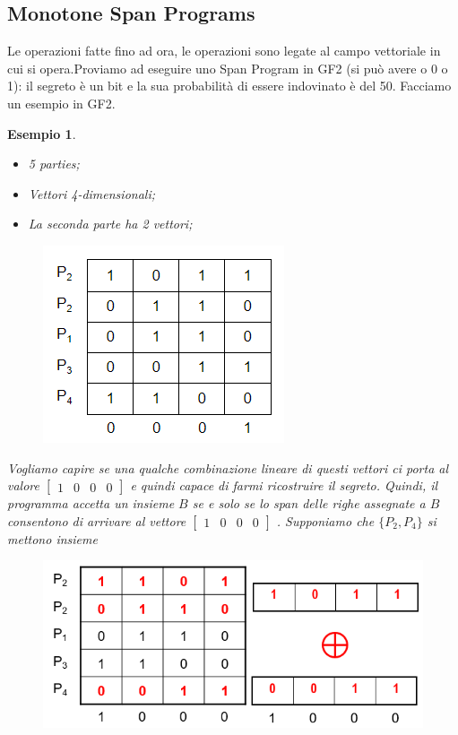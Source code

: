 \documentclass{book}
\newtheorem{esempio}{\textcolor{Grey1}{Esempio}}
\begin{document}
\subsection{Monotone Span Programs}
Le operazioni fatte fino ad ora, le operazioni sono legate al campo vettoriale in cui si opera\@.Proviamo ad eseguire uno Span Program in GF2 (si può avere o 0 o 1): il segreto è un bit e la sua probabilità di essere indovinato è del 50. Facciamo un esempio in GF2.
\begin{esempio}
\begin{itemize}
    \item 5 parties;
    \item Vettori 4-dimensionali;
    \item La seconda parte ha 2 vettori;
\end{itemize}
\begin{figure}[h]
    \centering
    \includegraphics[scale=0.5]{2022-01-08-15-15-29.png}%
\end{figure}
Vogliamo capire se una qualche combinazione lineare di questi vettori ci porta al valore \(\begin{bmatrix}
    1&0&0&0
\end{bmatrix}\) e quindi capace di farmi ricostruire il segreto\@. Quindi, il programma accetta un insieme \(B\) se e solo se lo span delle righe assegnate a \(B\) consentono di arrivare al vettore \(\begin{bmatrix}
    1&0&0&0
\end{bmatrix}\) \@.
Supponiamo che \( \{P_{2},P_{4}\} \) si mettono insieme
\setlength\intextsep{0pt}
\begin{figure}[h]
	\centering
	\includegraphics[scale=0.4]{2022-01-08-15-24-44.png}%
\end{figure}
\end{esempio}
\end{document}
